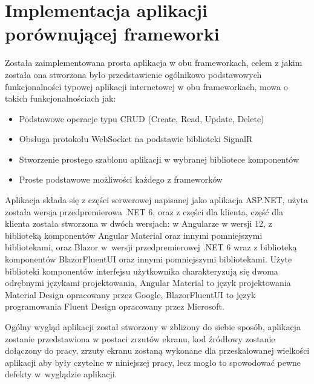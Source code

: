 \documentclass[12pt,a4paper,oneside]{book}
\begin{document}

\chapter{Implementacja aplikacji porównującej frameworki}\label{ch_4}

Została zaimplementowana prosta aplikacja w obu frameworkach, celem z jakim została ona stworzona było przedstawienie ogólnikowo podstawowych funkcjonalności typowej aplikacji internetowej w obu frameworkach, mowa o takich funkcjonalnościach jak:

\begin{itemize}
  \item Podstawowe operacje typu CRUD (Create, Read, Update, Delete)
  \item Obsługa protokołu WebSocket na podstawie biblioteki SignalR
  \item Stworzenie prostego szablonu aplikacji w wybranej bibliotece komponentów
  \item Proste podstawowe możliwości każdego z frameworków
\end{itemize}

Aplikacja składa się z części serwerowej napisanej jako aplikacja ASP.NET, użyta została wersja przedpremierowa .NET 6, oraz z części dla klienta, część dla klienta została stworzona w dwóch wersjach: w Angularze w wersji 12, z biblioteką komponentów Angular Material oraz innymi pomniejszymi bibliotekami, oraz Blazor w~wersji przedpremierowej .NET 6 wraz z biblioteką komponentów BlazorFluentUI oraz innymi pomniejszymi bibliotekami. Użyte biblioteki komponentów interfejsu użytkownika charakteryzują się dwoma odrębnymi językami projektowania, Angular Material to język projektowania Material Design opracowany przez Google, BlazorFluentUI to język programowania Fluent Design opracowany przez Microsoft.

Ogólny wygląd aplikacji został stworzony w zbliżony do siebie sposób, aplikacja zostanie przedstawiona w postaci zrzutów ekranu, kod źródłowy zostanie dołączony do pracy, zrzuty ekranu zostaną wykonane dla przeskalowanej wielkości aplikacji aby były czytelne w niniejszej pracy, lecz mogło to spowodować pewne defekty w~wyglądzie aplikacji.
\end{document}
